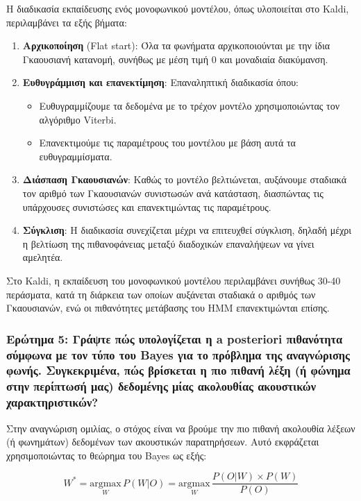\documentclass[a4paper,12pt]{article}
\begin{document}
Η διαδικασία εκπαίδευσης ενός μονοφωνικού μοντέλου, όπως υλοποιείται στο Kaldi, περιλαμβάνει τα εξής βήματα:

\begin{enumerate}
    \item \textbf{Αρχικοποίηση} (Flat start): Όλα τα φωνήματα αρχικοποιούνται με την ίδια Γκαουσιανή κατανομή, συνήθως με μέση τιμή 0 και μοναδιαία διακύμανση.
    
    \item \textbf{Ευθυγράμμιση και επανεκτίμηση}: Επαναληπτική διαδικασία όπου:
    \begin{itemize}
        \item Ευθυγραμμίζουμε τα δεδομένα με το τρέχον μοντέλο χρησιμοποιώντας τον αλγόριθμο Viterbi.
        \item Επανεκτιμούμε τις παραμέτρους του μοντέλου με βάση αυτά τα ευθυγραμμίσματα.
    \end{itemize}
    
    \item \textbf{Διάσπαση Γκαουσιανών}: Καθώς το μοντέλο βελτιώνεται, αυξάνουμε σταδιακά τον αριθμό των Γκαουσιανών συνιστωσών ανά κατάσταση, διασπώντας τις υπάρχουσες συνιστώσες και επανεκτιμώντας τις παραμέτρους.
    
    \item \textbf{Σύγκλιση}: Η διαδικασία συνεχίζεται μέχρι να επιτευχθεί σύγκλιση, δηλαδή μέχρι η βελτίωση της πιθανοφάνειας μεταξύ διαδοχικών επαναλήψεων να γίνει αμελητέα.
\end{enumerate}

Στο Kaldi, η εκπαίδευση του μονοφωνικού μοντέλου περιλαμβάνει συνήθως 30-40 περάσματα, κατά τη διάρκεια των οποίων αυξάνεται σταδιακά ο αριθμός των Γκαουσιανών, ενώ οι πιθανότητες μετάβασης του HMM επανεκτιμώνται επίσης.

\subsubsection*{Ερώτημα 5: Γράψτε πώς υπολογίζεται η a posteriori πιθανότητα σύμφωνα με τον τύπο του Bayes για το πρόβλημα της αναγνώρισης φωνής. Συγκεκριμένα, πώς βρίσκεται η πιο πιθανή λέξη (ή φώνημα στην περίπτωσή μας) δεδομένης μίας ακολουθίας ακουστικών χαρακτηριστικών?}

Στην αναγνώριση ομιλίας, ο στόχος είναι να βρούμε την πιο πιθανή ακολουθία λέξεων (ή φωνημάτων) δεδομένων των ακουστικών παρατηρήσεων. Αυτό εκφράζεται χρησιμοποιώντας το θεώρημα του Bayes ως εξής:

\begin{equation}
W^* = \underset{W}{\text{argmax}} \, P(W|O) = \underset{W}{\text{argmax}} \, \frac{P(O|W) \times P(W)}{P(O)}
\end{equation}
\end{document}
